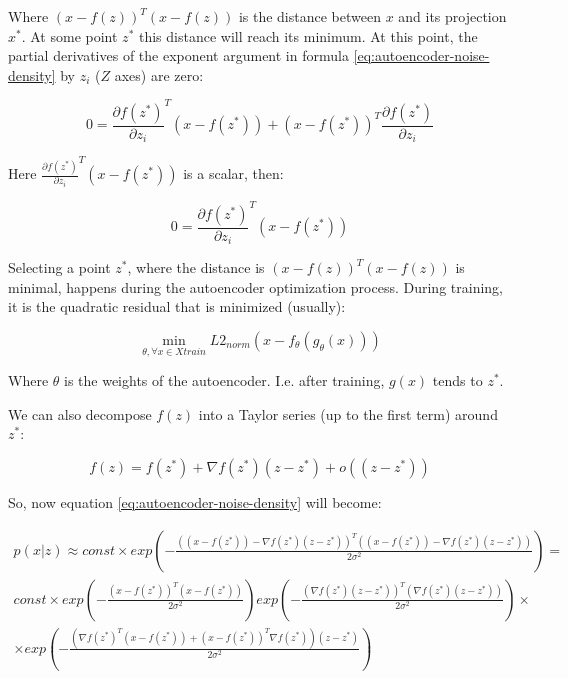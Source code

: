 Where $(x-f(z))^T (x-f(z))$ is the distance between $x$ and its projection $x^*$. At some point $z^*$ this distance will reach its minimum. At this point, the partial derivatives of the exponent argument in formula \ref{eq:autoencoder-noise-density} by $z_i$ ($Z$ axes) are zero:

\begin{equation}
    \label{eq:autoencoder-derivatives}
    0 = \frac{\partial f(z^*)}{\partial z_i}^T(x-f(z^*))+(x-f(z^*))^T\frac{\partial f(z^*)}{\partial z_i}
\end{equation}

Here $\frac{\partial f(z^*)}{\partial z_i}^T(x-f(z^*))$ is a scalar, then:

\begin{equation}
    \label{eq:autoencoder-derivatives-1}
    0 = \frac{\partial f(z^*)}{\partial z_i}^T(x-f(z^*))
\end{equation}

Selecting a point $z^*$, where the distance is $(x-f(z))^T (x-f(z))$ is minimal, happens during the autoencoder optimization process. During training, it is the quadratic residual that is minimized (usually):

\begin{equation}
    \label{eq:autoencoder-minimized}
    \min\limits_{\theta, \forall x\in X train} L2_{norm}({x-f_\theta(g_\theta(x))})
\end{equation}

Where $\theta$ is the weights of the autoencoder. I.e. after training, $g(x)$ tends to $z^*$.

We can also decompose $f(z)$ into a Taylor series (up to the first term) around $z^*$:

\begin{equation}
    \label{eq:autoencoder-taylor}
    f(z)=f(z^*)+\nabla f(z^*)(z-z^*)+o((z-z^*))
\end{equation}

So, now equation \ref{eq:autoencoder-noise-density} will become:

\begin{equation}
    \label{eq:autoencoder-}
    \begin{split}
        p(x|z) \approx const\times exp( -\frac{((x-f(z^*))-\nabla f(z^*)(z-z^*))^T ((x-f(z^*))-\nabla f(z^*)(z-z^*))}{2\sigma^2} )=\\
        const\times exp(-\frac{(x-f(z^*))^T(x-f(z^*))}{2\sigma^2})exp(-\frac{(\nabla f(z^*)(z-z^*))^T(\nabla f(z^*)(z-z^*))}{2\sigma^2}) \times \\
        \times exp(-\frac{( \nabla f(z^*)^T(x-f(z^*))+(x-f(z^*))^T\nabla f(z^*))(z-z^*)}{2\sigma^2})
    \end{split}
\end{equation}

